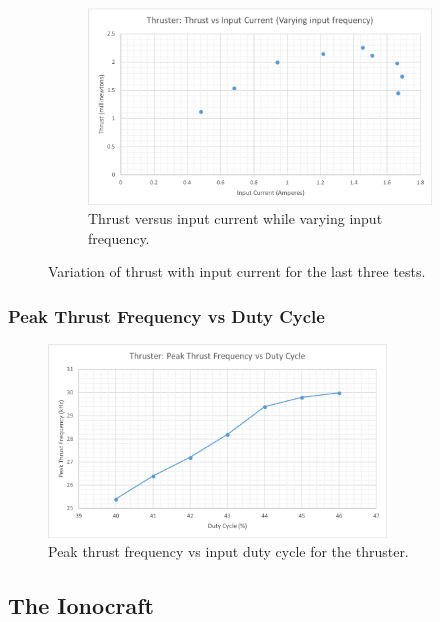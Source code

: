\documentclass[11pt]{article}
\begin{document}
\begin{figure}[h!]
\begin{subfigure}{0.49\textwidth}
\end{subfigure}
\begin{subfigure}{0.49\textwidth}
\centering
\includegraphics[width = \textwidth]{thruster_c3}
\caption{\label{fig:thruster_c3} Thrust versus input current while varying input frequency.}
\end{subfigure}
\caption{\label{fig:thruster_current} Variation of thrust with input current for the last three tests.}
\end{figure}

\subsubsection{Peak Thrust Frequency vs Duty Cycle}

\begin{figure}[h!]
\centering
\includegraphics[width = 0.8\textwidth]{thruster_g4}
\caption{\label{fig:thruster_g4} Peak thrust frequency vs input duty cycle for the thruster.}
\end{figure}


\pagebreak
\subsection{The Ionocraft}
\end{document}
